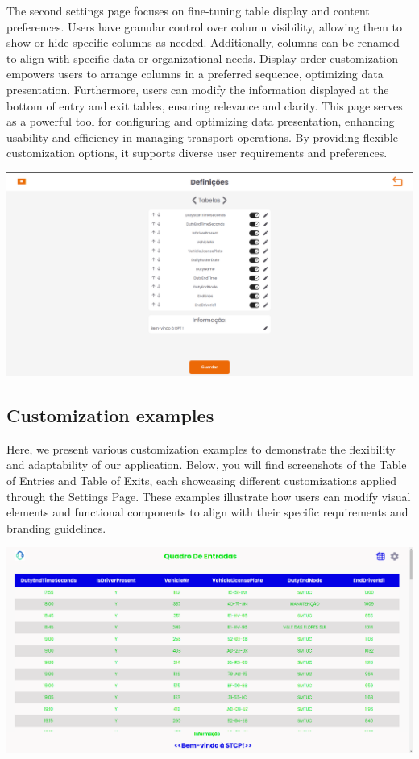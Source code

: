 \documentclass[10pt]{article}
\begin{document}
        The second settings page focuses on fine-tuning table display and content preferences. Users have granular control over column visibility, allowing them to show or hide specific columns as needed. Additionally, columns can be renamed to align with specific data or organizational needs.
        Display order customization empowers users to arrange columns in a preferred sequence, optimizing data presentation. Furthermore, users can modify the information displayed at the bottom of entry and exit tables, ensuring relevance and clarity.
        This page serves as a powerful tool for configuring and optimizing data presentation, enhancing usability and efficiency in managing transport operations. By providing flexible customization options, it supports diverse user requirements and preferences.
        

            \vfill
        \includegraphics[width=1\textwidth]{tabelas}
            \vfill

        \subsection{Customization examples}

        Here, we present various customization examples to demonstrate the flexibility and adaptability of our application. Below, you will find screenshots of the Table of Entries and Table of Exits, each showcasing different customizations applied through the Settings Page. These examples illustrate how users can modify visual elements and functional components to align with their specific requirements and branding guidelines.

            \vfill
        \includegraphics[width=1\textwidth]{table_of_entries_stcp1}
            \vfill
\end{document}
